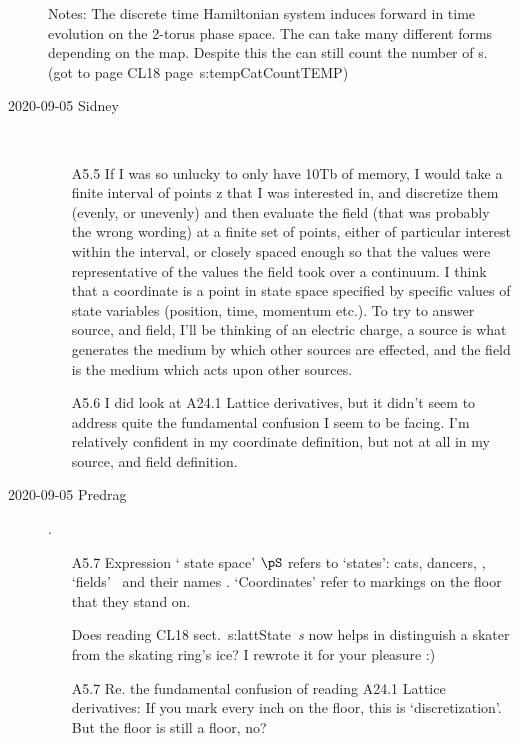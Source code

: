 \begin{description}
\vspace{3mm}

Notes: The discrete time Hamiltonian system induces forward in time evolution
on the 2-torus phase space. The {\jacobianOrb} can take many different forms
depending on the map. Despite this the {\HillDet} can still count the
number of {\lattstate}s.
(got to page CL18 page~{s:tempCatCountTEMP})

\item[2020-09-05 Sidney]~~
\begin{itemize}
	\item[A5.5]
If I was so unlucky to only have 10Tb of memory, I would take a finite
interval of points z that I was interested in, and discretize them
(evenly, or unevenly) and then evaluate the field (that was probably the
wrong wording) at a finite set of points, either of particular interest
within the interval, or closely spaced enough so that the values were
representative of the values the field took over a continuum. I think
that a coordinate is a point in state space specified by specific values
of state variables (position, time, momentum etc.). To try to answer
source, and field, I'll be thinking of an electric charge, a source is
what generates the medium by which other sources are effected, and the
field is the medium which acts upon other sources.

	\item[A5.6]
I did look at
{A24.1 Lattice derivatives}, but it didn't seem to address quite the
fundamental confusion I seem to be facing. I'm relatively confident in my
coordinate definition, but not at all in my source, and field definition.
\end{itemize}

\item[2020-09-05 Predrag].
\begin{itemize}
	\item[A5.7]
Expression ` state space' $\pS$ refers to `states': cats, dancers,
\ie, `fields' \Xx\ and their
names \Mm. `Coordinates' refer to markings on the floor that they stand on.

Does reading CL18 sect.~{s:lattState}~{\em {\Lattstate}s} now helps in
distinguish a skater from the skating ring's ice? I rewrote it for your
pleasure :)
	\item[A5.7]
Re. the fundamental confusion of reading
 {A24.1
Lattice derivatives}: If you mark every inch on the floor, this is
`discretization'. But the floor is still a floor, no?
\end{itemize}


\end{description}
